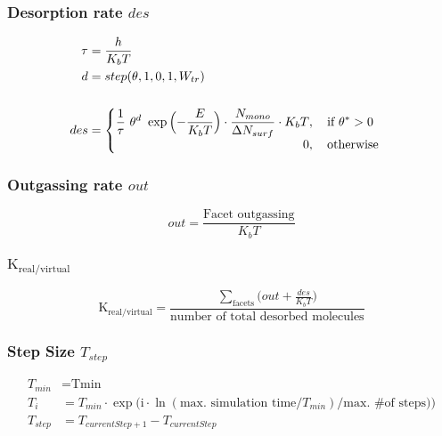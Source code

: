 \subsubsection*{Desorption rate $des$}
\begin{equation}
	\label{eq:des}
	\begin{split}
	\tau&=\frac{h}{K_b T}\\
	d&= step(\theta, 1,  0, 1, W_{tr})\\
	&\\
	des&=
	\begin{cases}
		\begin{split}
		\frac{1}{\tau}\ \theta^d\ \exp\Big({-\frac{E}{K_b T}}\Big)\cdot \frac{N_{mono}}{\Delta N_{surf}}\cdot K_b T&, \text{\quad if}\ \theta^* > \text{0}\\
		0&,  \text{\quad otherwise}
		\end{split}
	\end{cases}
	\end{split}
\end{equation}

\subsubsection*{Outgassing rate $out$}
\begin{equation}
	\label{eq:out}
	out=\frac{\text{Facet outgassing}}{K_b T}
\end{equation}

\subsubsection*{$\text{K}_{\text{real}/\text{virtual}}$}
\begin{equation}
	\label{eq:krealvirt}
	\text{K}_{\text{real}/\text{virtual}}=\frac{\sum\limits_{\text{facets}}\Big(out + \frac{des}{K_b T}\Big)}{\text{number of total desorbed molecules}}
\end{equation}


\subsubsection*{Step Size $T_{step}$}
\begin{equation}
	\label{eq:tstep}
	\begin{split}
	T_{min}&=\text{Tmin}\\
	T_{i}&=T_{min} \cdot \exp\Big(\text{i}\cdot \ln(\text{max. simulation time}/T_{min})/\text{max. \# of steps})\Big)\\
	T_{step}&=T_{currentStep+1}-T_{currentStep}\\
	\end{split}
\end{equation}

